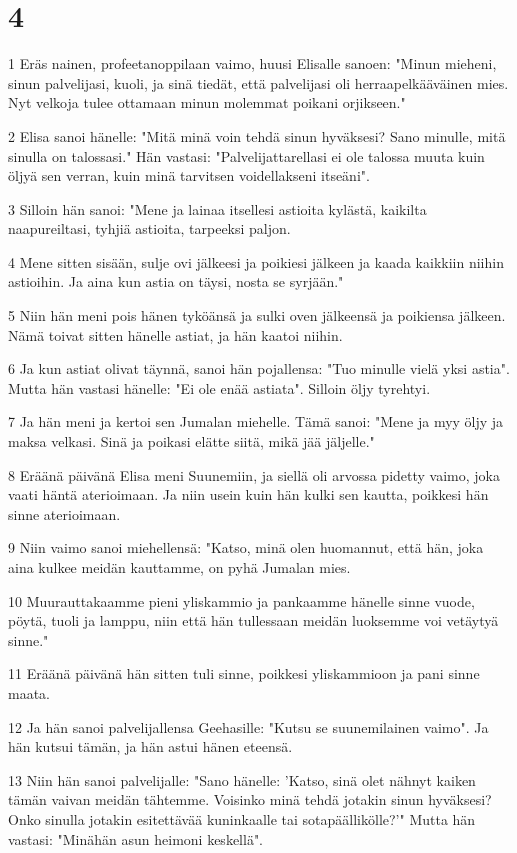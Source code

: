 \chapter{4}

\par 1 Eräs nainen, profeetanoppilaan vaimo, huusi Elisalle sanoen: "Minun mieheni, sinun palvelijasi, kuoli, ja sinä tiedät, että palvelijasi oli herraapelkääväinen mies. Nyt velkoja tulee ottamaan minun molemmat poikani orjikseen."
\par 2 Elisa sanoi hänelle: "Mitä minä voin tehdä sinun hyväksesi? Sano minulle, mitä sinulla on talossasi." Hän vastasi: "Palvelijattarellasi ei ole talossa muuta kuin öljyä sen verran, kuin minä tarvitsen voidellakseni itseäni".
\par 3 Silloin hän sanoi: "Mene ja lainaa itsellesi astioita kylästä, kaikilta naapureiltasi, tyhjiä astioita, tarpeeksi paljon.
\par 4 Mene sitten sisään, sulje ovi jälkeesi ja poikiesi jälkeen ja kaada kaikkiin niihin astioihin. Ja aina kun astia on täysi, nosta se syrjään."
\par 5 Niin hän meni pois hänen tyköänsä ja sulki oven jälkeensä ja poikiensa jälkeen. Nämä toivat sitten hänelle astiat, ja hän kaatoi niihin.
\par 6 Ja kun astiat olivat täynnä, sanoi hän pojallensa: "Tuo minulle vielä yksi astia". Mutta hän vastasi hänelle: "Ei ole enää astiata". Silloin öljy tyrehtyi.
\par 7 Ja hän meni ja kertoi sen Jumalan miehelle. Tämä sanoi: "Mene ja myy öljy ja maksa velkasi. Sinä ja poikasi elätte siitä, mikä jää jäljelle."
\par 8 Eräänä päivänä Elisa meni Suunemiin, ja siellä oli arvossa pidetty vaimo, joka vaati häntä aterioimaan. Ja niin usein kuin hän kulki sen kautta, poikkesi hän sinne aterioimaan.
\par 9 Niin vaimo sanoi miehellensä: "Katso, minä olen huomannut, että hän, joka aina kulkee meidän kauttamme, on pyhä Jumalan mies.
\par 10 Muurauttakaamme pieni yliskammio ja pankaamme hänelle sinne vuode, pöytä, tuoli ja lamppu, niin että hän tullessaan meidän luoksemme voi vetäytyä sinne."
\par 11 Eräänä päivänä hän sitten tuli sinne, poikkesi yliskammioon ja pani sinne maata.
\par 12 Ja hän sanoi palvelijallensa Geehasille: "Kutsu se suunemilainen vaimo". Ja hän kutsui tämän, ja hän astui hänen eteensä.
\par 13 Niin hän sanoi palvelijalle: "Sano hänelle: 'Katso, sinä olet nähnyt kaiken tämän vaivan meidän tähtemme. Voisinko minä tehdä jotakin sinun hyväksesi? Onko sinulla jotakin esitettävää kuninkaalle tai sotapäällikölle?'" Mutta hän vastasi: "Minähän asun heimoni keskellä".
